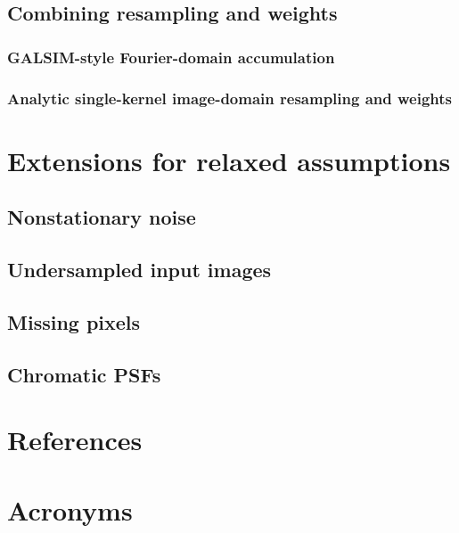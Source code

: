 \documentclass[DM,authoryear,toc]{lsstdoc}
\begin{document}
\subsection{Combining resampling and weights}

\subsubsection{GALSIM-style Fourier-domain accumulation}

\subsubsection{Analytic single-kernel image-domain resampling and weights}

\section{Extensions for relaxed assumptions}

\label{sec:extensions}

\subsection{Nonstationary noise}

\subsection{Undersampled input images}

\subsection{Missing pixels}

\subsection{Chromatic PSFs}


\appendix
\section{References} \label{sec:bib}
\renewcommand{\refname}{} %


\section{Acronyms} \label{sec:acronyms}

\end{document}
